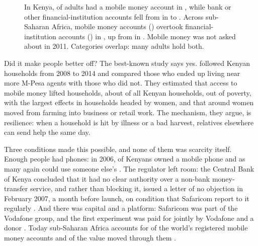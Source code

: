 \begin{figure}[htbp]
\centering

\caption{ In Kenya,
\kenMobileMoney{} of adults had a mobile money account in \findexYear{}, while
bank or other financial-institution accounts fell from \kenBankAccountPeak{} in
\kenBankAccountPeakYear{} to \kenBankAccount{}. Across sub-Saharan Africa,
mobile money accounts (\ssaMobileMoney{}) overtook financial-institution
accounts (\ssaBankAccount{}) in \findexYear{}, up from \ssaMobileMoneyStart{} in
\ssaMobileMoneyStartYear{}. Mobile money was not asked about in 2011.
Categories overlap: many adults hold both.
}
\label{fig:findex-accounts}
\end{figure}

Did it make people better off? The best-known study says yes.
\textcite{suri2016} followed Kenyan households from 2008 to 2014 and compared
those who ended up living near more M-Pesa agents with those who did not. They
estimated that access to mobile money lifted \mpesaHouseholdsLifted{}
households, about \mpesaHouseholdsShare{} of all Kenyan households, out of
poverty, with the largest effects in households headed by women, and that
around \mpesaWomenMoved{} women moved from farming into business or retail
work. The mechanism, they argue, is resilience: when a household is hit by
illness or a bad harvest, relatives elsewhere can send help the same day.

Three conditions made this possible, and none of them was scarcity itself.
Enough people had phones: in 2006, \kenyaPhoneOwners{} of Kenyans owned a
mobile phone and as many again could use someone else's \parencite{afi2010}.
The regulator left room: the Central Bank of Kenya concluded that it had no
clear authority over a non-bank money-transfer service, and rather than
blocking it, issued a letter of no objection in February 2007, a month before
launch, on condition that Safaricom report to it regularly
\parencite{afi2010}. And there was capital and a platform: Safaricom was part
of the Vodafone group, and the first experiment was paid for jointly by
Vodafone and a donor \parencite{hughes2007,phillips2013dfid}. Today
sub-Saharan Africa accounts for \gsmaRegisteredSSA{} of the world's
registered mobile money accounts and \gsmaValueSSA{} of the value moved
through them \parencite{gsma2026sotir}.


